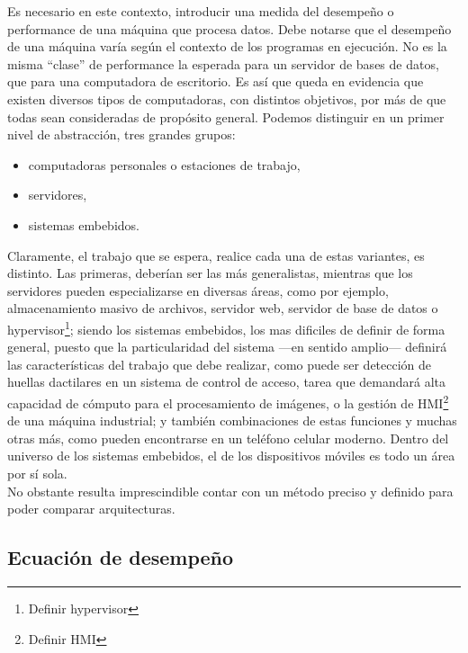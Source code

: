 Es necesario en este contexto, introducir una medida del desempeño o 
performance de una máquina que procesa datos. Debe notarse que el desempeño de 
una máquina varía según el contexto de los programas en ejecución. No es la 
misma ``clase'' de performance la esperada para un servidor de bases de datos, 
que para una computadora de escritorio. Es así que queda en evidencia que 
existen diversos tipos de computadoras, con distintos objetivos, por más de que 
todas sean consideradas de propósito general. Podemos distinguir en un primer 
nivel de abstracción, tres grandes grupos:
\begin{itemize}
  \item computadoras personales o estaciones de trabajo,
  \item servidores,
  \item sistemas embebidos.
\end{itemize}
Claramente, el trabajo que se espera, realice cada una de estas variantes, es 
distinto. Las primeras, deberían ser las más generalistas, mientras que los 
servidores pueden especializarse en diversas áreas, como por ejemplo, 
almacenamiento masivo de archivos, servidor web, servidor de base de datos o 
hypervisor\footnote{Definir hypervisor}; siendo los sistemas embebidos, los mas 
dificiles de definir de forma general, puesto que la particularidad del sistema 
---en sentido amplio--- definirá las características del trabajo que debe 
realizar, como puede ser detección de huellas dactilares en un sistema de 
control de acceso, tarea que demandará alta capacidad de cómputo para el 
procesamiento de imágenes, o la gestión de HMI\footnote{Definir HMI} de una 
máquina industrial; y también combinaciones de estas funciones y muchas otras 
más, como pueden encontrarse en un teléfono celular moderno. Dentro del 
universo de los sistemas embebidos, el de los dispositivos móviles es todo un 
área por sí sola.\\
No obstante resulta imprescindible contar con un método preciso y definido para 
poder comparar arquitecturas.

\subsection{Ecuación de desempeño}
\label{subsec:performance-performance_definition}

